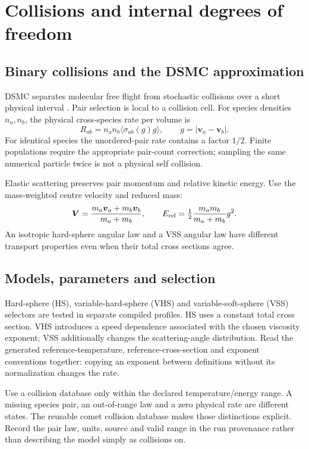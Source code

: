 \chapter{Collisions and internal degrees of freedom}\label{ch:collisions}
\section{Binary collisions and the DSMC approximation}
DSMC separates molecular free flight from stochastic collisions over a short
physical interval \cite{bird1994}. Pair selection is local to a collision cell.
For species densities $n_a,n_b$, the physical cross-species rate per volume is
\begin{equation}
R_{ab}=n_a n_b\langle \sigma_{ab}(g)g\rangle,\qquad
g=|\boldsymbol v_a-\boldsymbol v_b|.
\end{equation}
For identical species the unordered-pair rate contains a factor $1/2$.
Finite populations require the appropriate pair-count correction; sampling
the same numerical particle twice is not a physical self collision.

Elastic scattering preserves pair momentum and relative kinetic energy.
Use the mass-weighted centre velocity and reduced mass:
\begin{equation}
\boldsymbol V=\frac{m_a\boldsymbol v_a+m_b\boldsymbol v_b}{m_a+m_b},
\qquad E_{\rm rel}=\tfrac12\frac{m_am_b}{m_a+m_b}g^2.
\end{equation}
An isotropic hard-sphere angular law and a VSS angular law have different
transport properties even when their total cross sections agree.

\section{Models, parameters and selection}
Hard-sphere (HS), variable-hard-sphere (VHS) and variable-soft-sphere (VSS)
selectors are tested in separate compiled profiles. HS uses a constant total
cross section. VHS introduces a speed dependence associated with the chosen
viscosity exponent; VSS additionally changes the scattering-angle
distribution. Read the generated reference-temperature, reference-cross-section
and exponent conventions together: copying an exponent between definitions
without its normalization changes the rate.

Use a collision database only within the declared temperature/energy range.
A missing species pair, an out-of-range law and a zero physical rate are
different states. The reusable comet collision database makes those
distinctions explicit. Record the pair law, units, source and valid range in
the run provenance rather than describing the model simply as collisions on.

